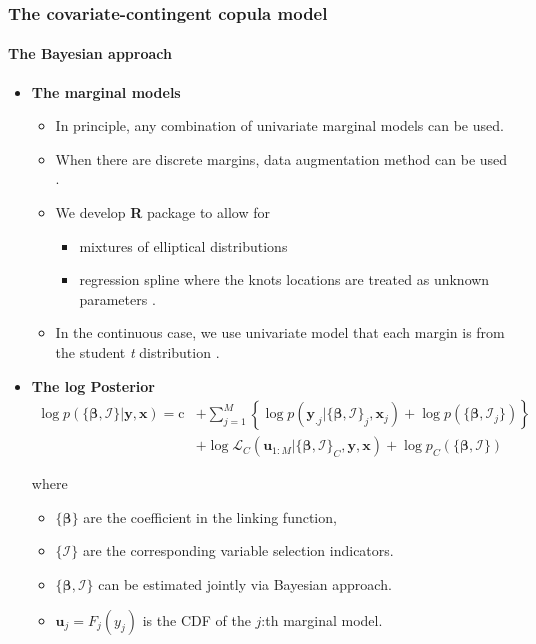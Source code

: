 \documentclass{beamer}
\begin{document}
\begin{frame}[allowframebreaks]
  \frametitle{The covariate-contingent copula model}
  \framesubtitle{The Bayesian approach}
  \begin{itemize}
  \item \textbf{The marginal models}
    \begin{itemize}
    \item In principle, any combination of univariate marginal models can be
      used.
    \item When there are discrete margins, data augmentation method can be used
      {\color{blue}\citep{smith2012estimation}}.

    \item We develop \textbf{R} package to allow for
      \begin{itemize}
      \item mixtures of elliptical distributions {\color{blue}\citep{li2010flexible}}
      \item regression spline where the knots locations are treated as unknown parameters
        {\color{blue}\citep{li2013efficient}}.
      \end{itemize}


    \item In the continuous case, we use univariate model that each margin is
      from the student \emph{t} distribution .
    \end{itemize}

  \item \textbf{The log Posterior}
    \[
      \begin{split}\log p(\{\bm{\beta},\bm{\mathcal{I}}\}|\bm{y},\bm{x})=
        \mathrm{c}&+\sum\nolimits _{j=1}^{M}\left\{\log
          p(\bm{y}_{.j}|\{\bm{\beta},\bm{\mathcal{I}}\}_{j},\bm{x}_{j}) + \log p(\{\bm{\beta},\bm{\mathcal{I}}_j\}) \right\}\\
        & +\log\mathcal{L}_{C}(\bm{u}_{1:M}|\{\bm{\beta},\bm{\mathcal{I}}\}_{C},\bm{y},\bm{x})+
        \log p_C(\{\bm{\beta},\bm{\mathcal{I}}\})
      \end{split}
    \]

    where
    \begin{itemize}
    \item $\{\bm{\beta}\}$ are the coefficient in the linking function,
    \item $\{\bm{\mathcal{I}}\}$ are the corresponding variable selection indicators.
    \item $\{\bm{\beta},\bm{\mathcal{I}}\}$ can be estimated jointly via Bayesian approach.
    \item $\bm{u}_{j}=F_{j}(y_{j})$ is the CDF of the $j$:th marginal model.
    \end{itemize}


\end{itemize}
\end{frame}
\end{document}
